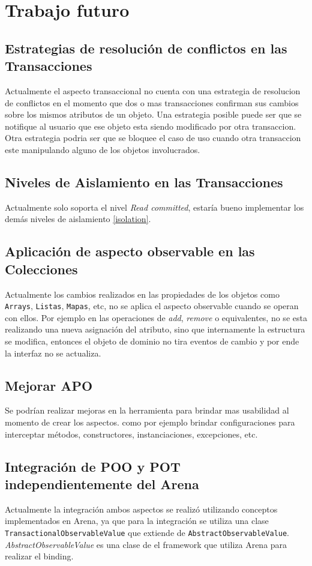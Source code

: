 
\section{Trabajo futuro}
\label{sec:futurework}

	\subsection{Estrategias de resolución de conflictos en las Transacciones}
		Actualmente el aspecto transaccional no cuenta con una estrategia de
		resolucion de conflictos en	 el momento que dos o mas transacciones
		confirman sus cambios sobre los mismos atributos de un objeto.
		Una estrategia posible puede ser que se notifique al usuario que ese
		objeto esta siendo modificado por otra transaccion.
		Otra estrategia podria ser que se bloquee el caso de uso cuando otra
		transaccion este manipulando alguno de los objetos involucrados.

	\subsection{Niveles de Aislamiento en las Transacciones}
		Actualmente solo soporta el nivel \emph{Read committed}, estaría bueno
		implementar los demás niveles de aislamiento \ref{isolation}.
	
	\subsection{Aplicación de aspecto observable en las Colecciones}
		Actualmente los cambios realizados en las propiedades de los objetos como
		\lstinline|Arrays|, \lstinline|Listas|, \lstinline|Mapas|, etc, no se aplica
		el aspecto observable cuando se operan con ellos. Por ejemplo en las
		operaciones de \emph{add}, \emph{remove} o equivalentes, no se esta 
		realizando una nueva asignación del atributo, sino que internamente la
		estructura se modifica, entonces el objeto de dominio no tira eventos de
		cambio y por ende la interfaz no se actualiza.
		
	\subsection{Mejorar APO}
		Se podrían realizar mejoras en la herramienta para brindar mas usabilidad al
		momento de crear los aspectos. como por ejemplo brindar configuraciones para
		interceptar métodos, constructores, instanciaciones, excepciones, etc.
		
	\subsection{Integración de POO y POT independientemente del Arena}
		Actualmente la integración ambos aspectos se realizó utilizando conceptos
		implementados en Arena, ya que para la integración se utiliza una clase
		\lstinline|TransactionalObservableValue| que extiende de
		\lstinline|AbstractObservableValue|. \emph{AbstractObservableValue} es una
		clase de el framework que utiliza Arena para realizar el binding.
